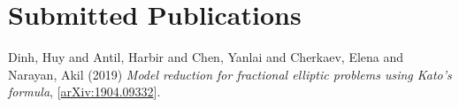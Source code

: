 \newcommand{\arxiv}[1]{[\href{http://arxiv.org/abs/#1}{arXiv:#1}]}


\setcounter{numPubs}{1}
\setcounter{pubCounter}{\value{numPubs}}


\section{\sc Submitted Publications}
  Dinh, Huy and Antil, Harbir and Chen, Yanlai and Cherkaev, Elena and Narayan, Akil
  (2019)
  {\it Model reduction for fractional elliptic problems using Kato's formula},
  \arxiv{1904.09332}.



